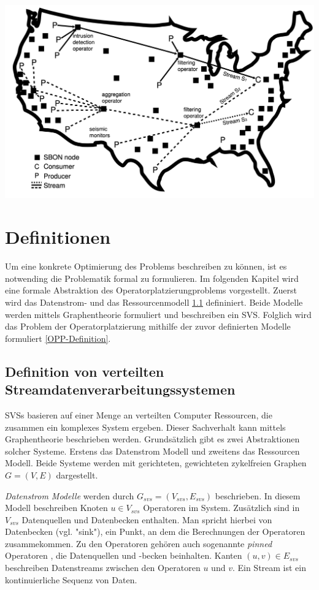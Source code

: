 \documentclass{article}
\begin{document}
\begin{center}
    \includegraphics[width=0.5\linewidth]{SVS.png}
\end{center}



\section{Definitionen}
Um eine konkrete Optimierung des Problems beschreiben zu können, ist es notwending die Problematik formal zu formulieren. 
Im folgenden Kapitel %
wird eine formale Abstraktion des Operatorplatzierungproblems vorgestellt. Zuerst wird das Datenstrom- 
und das Ressourcenmodell \ref{SVS-Definition} defininiert. Beide Modelle werden mittels Graphentheorie formuliert und beschreiben 
ein SVS. 
Folglich wird das Problem der Operatorplatzierung mithilfe der zuvor definierten Modelle formuliert \ref{OPP-Definition}. 


\subsection{Definition von verteilten Streamdatenverarbeitungssystemen}  \label{SVS-Definition}  %
SVSs basieren auf einer Menge an verteilten Computer Ressourcen, die zusammen ein komplexes System ergeben. 
Dieser Sachverhalt kann mittels Graphentheorie beschrieben werden. Grundsätzlich gibt es zwei Abstraktionen solcher Systeme. 
Erstens das Datenstrom Modell und zweitens das Ressourcen Modell. 
Beide Systeme werden mit gerichteten, gewichteten zykelfreien Graphen $G = (V,E)$ dargestellt. 

\textit{Datenstrom Modelle} werden durch $G_{svs} = (V_{svs}, E_{svs})$ beschrieben. In diesem Modell beschreiben Knoten $u \in V_{svs}$ Operatoren im System. 
Zusätzlich sind in $V_{svs}$ Datenquellen und Datenbecken enthalten. Man spricht hierbei von Datenbecken (vgl. "sink"), ein Punkt, an dem die Berechnungen der Operatoren zusammekommen. 
Zu den Operatoren gehören auch sogenannte \textit{pinned} Operatoren \cite{efficient-operator-placement}, 
die Datenquellen und -becken beinhalten. Kanten $(u,v) \in E_{svs}$ beschreiben Datenstreams 
zwischen den Operatoren $u$ und $v$.  Ein Stream ist ein kontinuierliche Sequenz von Daten. 
\end{document}
